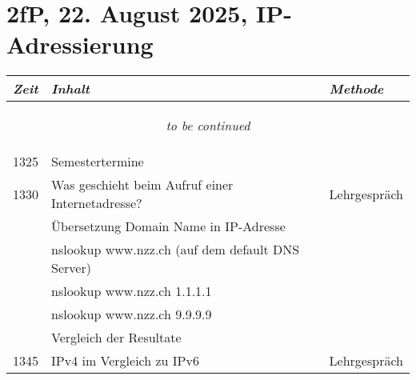 \documentclass[a4paper]{scrreprt}
\begin{document}
\section*{2fP, 22. August 2025, IP-Adressierung}
\begin{longtable}{p{1.5cm}>{\RaggedRight}p{7.5cm}p{2.5cm}}
    \toprule
    \emph{Zeit}&\emph{Inhalt}&\emph{Methode}\\
    \midrule
    \endhead

    \midrule
    \multicolumn{3}{c}{\begin{tiny}\textit{to be continued}\end{tiny}}\\
    \midrule
    \endfoot

    \bottomrule
    \endlastfoot

    1325&Semestertermine&\\ [5pt]

    1330&Was geschieht beim Aufruf einer Internetadresse?&Lehrgespräch\\
        &Übersetzung Domain Name in IP-Adresse&\\
        &nslookup www.nzz.ch (auf dem default DNS Server)&\\
        &nslookup www.nzz.ch 1.1.1.1&\\
        &nslookup www.nzz.ch 9.9.9.9&\\
        &Vergleich der Resultate&\\ [5pt]

    1345&IPv4 im Vergleich zu IPv6&Lehrgespräch\\


\end{longtable}
\end{document}
